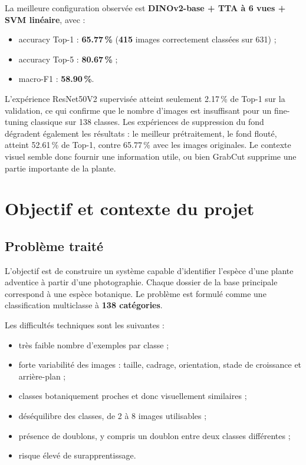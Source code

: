 \documentclass[12pt,a4paper]{report}
\newcommand{\pct}[1]{\num{#1}\,\%}
\begin{document}
La meilleure configuration observée est \textbf{DINOv2-base + TTA à 6 vues + SVM linéaire}, avec :
\begin{itemize}
  \item accuracy Top-1 : \textbf{\pct{65,77}} (\textbf{415} images correctement classées sur 631) ;
  \item accuracy Top-5 : \textbf{\pct{80,67}} ;
  \item macro-F1 : \textbf{\pct{58,90}}.
\end{itemize}

L'expérience ResNet50V2 supervisée atteint seulement \pct{2,17} de Top-1 sur la validation, ce qui confirme que le nombre d'images est insuffisant pour un fine-tuning classique sur 138 classes. Les expériences de suppression du fond dégradent également les résultats : le meilleur prétraitement, le fond flouté, atteint \pct{52,61} de Top-1, contre \pct{65,77} avec les images originales. Le contexte visuel semble donc fournir une information utile, ou bien GrabCut supprime une partie importante de la plante.

\chapter{Objectif et contexte du projet}

\section{Problème traité}

L'objectif est de construire un système capable d'identifier l'espèce d'une plante adventice à partir d'une photographie. Chaque dossier de la base principale correspond à une espèce botanique. Le problème est formulé comme une classification multiclasse à \textbf{138 catégories}.

Les difficultés techniques sont les suivantes :
\begin{itemize}
  \item très faible nombre d'exemples par classe ;
  \item forte variabilité des images : taille, cadrage, orientation, stade de croissance et arrière-plan ;
  \item classes botaniquement proches et donc visuellement similaires ;
  \item déséquilibre des classes, de 2 à 8 images utilisables ;
  \item présence de doublons, y compris un doublon entre deux classes différentes ;
  \item risque élevé de surapprentissage.
\end{itemize}
\end{document}
